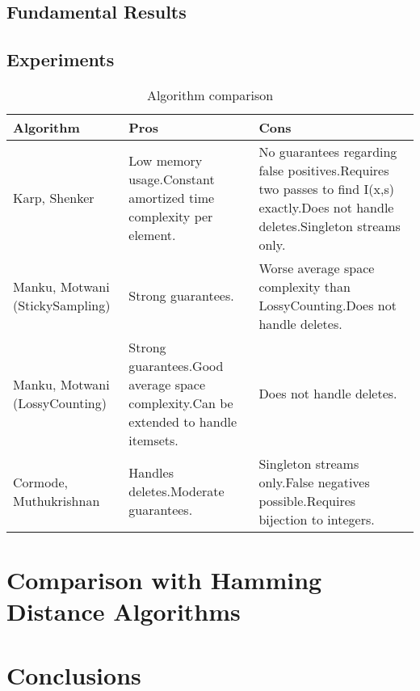 \documentclass[a4paper]{article}
\begin{document}
\subsection{Fundamental Results}

\subsection{Experiments}


\begin{table}
{\scriptsize 
\begin{tabulary}{1\textwidth}{LLL}
\hline \textbf{Algorithm}  %
& \textbf{Pros} & \textbf{Cons} \\ 
\hline Karp, Shenker %
& Low memory usage.\newline Constant amortized time complexity per element. & No guarantees regarding false positives.\newline Requires two passes to find I(x,s) exactly.\newline Does not handle deletes.\newline Singleton streams only. \\ 
\hline Manku, Motwani (StickySampling) %
& Strong guarantees. & Worse average space complexity than LossyCounting.\newline Does not handle deletes. \\ 
\hline Manku, Motwani (LossyCounting) %
& Strong guarantees.\newline Good average space complexity.\newline Can be extended to handle itemsets.  & Does not handle deletes. \\ 
\hline Cormode, Muthukrishnan  %
& Handles deletes.\newline Moderate guarantees. & Singleton streams only.\newline False negatives possible.\newline Requires bijection to integers. \\ 
\hline 

\end{tabulary}
}
\caption{Algorithm comparison}
\label{ComparisonTable}
\end{table}

\section{Comparison with Hamming Distance Algorithms}


\section{Conclusions}




\end{document}
